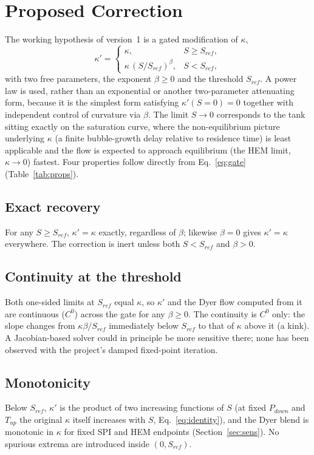 \documentclass[11pt,a4paper]{article}
\begin{document}
\section{Proposed Correction}\label{sec:correction}
The working hypothesis of version~1 is a gated modification of $\kappa$,
\begin{equation}
\kappa'=\begin{cases}\kappa, & S\geq S_{ref},\\[2pt] \kappa\,(S/S_{ref})^{\beta}, & S<S_{ref},\end{cases}
\label{eq:gate}
\end{equation}
with two free parameters, the exponent $\beta\geq0$ and the threshold $S_{ref}$. A power law is used, rather than an exponential or another two-parameter attenuating form, because it is the simplest form satisfying $\kappa'(S{=}0)=0$ together with independent control of curvature via $\beta$. The limit $S\to0$ corresponds to the tank sitting exactly on the saturation curve, where the non-equilibrium picture underlying $\kappa$ (a finite bubble-growth delay relative to residence time) is least applicable and the flow is expected to approach equilibrium (the HEM limit, $\kappa\to0$) fastest. Four properties follow directly from Eq.~\eqref{eq:gate} (Table~\ref{tab:props}).

\subsection{Exact recovery}
For any $S\geq S_{ref}$, $\kappa'=\kappa$ exactly, regardless of $\beta$; likewise $\beta=0$ gives $\kappa'=\kappa$ everywhere. The correction is inert unless both $S<S_{ref}$ and $\beta>0$.

\subsection{Continuity at the threshold}
Both one-sided limits at $S_{ref}$ equal $\kappa$, so $\kappa'$ and the Dyer flow computed from it are continuous ($C^0$) across the gate for any $\beta\geq0$. The continuity is $C^0$ only: the slope changes from $\kappa\beta/S_{ref}$ immediately below $S_{ref}$ to that of $\kappa$ above it (a kink). A Jacobian-based solver could in principle be more sensitive there; none has been observed with the project's damped fixed-point iteration.

\subsection{Monotonicity}
Below $S_{ref}$, $\kappa'$ is the product of two increasing functions of $S$ (at fixed $P_{down}$ and $T_{up}$ the original $\kappa$ itself increases with $S$, Eq.~\eqref{eq:identity}), and the Dyer blend is monotonic in $\kappa$ for fixed SPI and HEM endpoints (Section~\ref{sec:sens}). No spurious extrema are introduced inside $(0,S_{ref})$.
\end{document}
